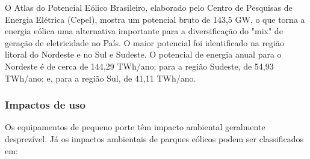 O Atlas do Potencial E\'olico Brasileiro, elaborado pelo Centro de Pesquisas de Energia El\'etrica (Cepel), mostra um potencial bruto de 143,5 GW, o que torna a energia e\'olica uma alternativa importante para a diversifica\c{c}\~ao do "mix" de gera\c{c}\~ao de eletricidade no Pa\'is. O maior potencial foi identificado na regi\~ao litoral do Nordeste e no Sul e Sudeste. O potencial de energia anual para o Nordeste \'e de cerca de 144,29 TWh/ano; para a regi\~ao Sudeste, de 54,93 TWh/ano; e, para a regi\~ao Sul, de 41,11 TWh/ano. \\

\subsubsection{Impactos de uso}

Os equipamentos de pequeno porte t\^em impacto ambiental geralmente desprez\'ivel. J\'a os impactos ambientais de parques e\'olicos podem ser classificados em:

